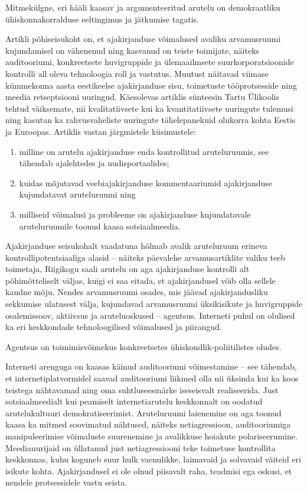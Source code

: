 \documentclass[estonian,]{article}
\begin{document}
\begin{blockquote-left}
Mitmekülgne, eri hääli kaasav ja argumenteeritud arutelu on
demokraatliku ühiskonnakorralduse eeltingimus ja jätkumise tagatis.
\end{blockquote-left}

Artikli põhiseisukoht on, et ajakirjanduse võimalused avaliku arvamusruumi kujundamisel on vähenenud ning kasvanud on teiste toimijate, näiteks auditooriumi, konkreetsete huvigruppide ja ülemaailmsete suurkorporatsioonide kontrolli all oleva tehnoloogia roll ja vastutus. Muutust näitavad viimase kümmekonna aasta eestikeelse ajakirjanduse sisu, toimetuste tööprotsesside ning meedia retseptsiooni uuringud. Käesolevas artiklis sünteesin Tartu Ülikoolis tehtud väiksemate, nii kvalitatiivsete kui ka kvantitatiivsete uuringute tulemusi ning kasutan ka rahvusvaheliste uuringute tähelepanekuid olukorra kohta Eestis ja Euroopas. Artiklis vastan järgmistele küsimustele:

\begin{enumerate}
\def\labelenumi{\arabic{enumi})}
\item
  milline on arutelu ajakirjanduse enda kontrollitud aruteluruumis, see tähendab ajalehtedes ja uudisportaalides;
\item
  kuidas mõjutavad veebiajakirjanduse kommentaariumid ajakirjanduse kujundatavat aruteluruumi ning
\item
  milliseid võimalusi ja probleeme on ajakirjanduse kujundatavale aruteluruumile toonud kaasa sotsiaalmeedia.
\end{enumerate}

Ajakirjanduse seisukohalt vaadatuna hõlmab avalik aruteluruum erineva kontrollipotentsiaaliga alasid -- näiteks päevalehe arvamusartiklite valiku teeb toimetaja, Riigikogu saali arutelu on aga ajakirjanduse kontrolli alt põhimõtteliselt väljas, kuigi ei saa eitada, et ajakirjandusel võib olla sellele kaudne mõju. Nendes arvamusruumi osades, mis jäävad ajakirjandusliku sekkumise ulatusest välja, kujundavad arvamusruumi üksikisikute ja huvigruppide osalemissoov, aktiivsus ja aruteluoskused -- agentsus. Interneti puhul on olulised ka eri keskkondade tehnoloogilised võimalused ja piirangud.

\begin{blockquote-left}
Agentsus on toimimisvõimekus konkreetsetes ühiskondlik-poliitilistes
oludes.
\end{blockquote-left}

Interneti arenguga on kaasas käinud auditooriumi võimestamine -- see tähendab, et internetiplatvormidel saavad auditooriumi liikmed olla nii üksinda kui ka koos teistega nähtavamad ning oma suhtluseesmärke iseseisvalt realiseerida. Just sotsiaalmeedialt kui peamiselt internetiarutelu keskkonnalt on oodatud arutelukultuuri demokratiseerimist. Aruteluruumi laienemine on aga toonud kaasa ka mitmed soovimatud nähtused, näiteks netiagressioon, auditooriumiga manipuleerimise võimaluste suurenemine ja avalikkuse hoiakute polariseerumine. Meediauurijaid on üllatanud just netiagressiooni teke toimetuse kontrollita keskkonnas, kuhu koguneb suur hulk vaenulikke, laimavaid ja solvavaid väiteid eri isikute kohta. Ajakirjandusel ei ole olnud piisavalt raha, teadmisi ega oskusi, et nendele protsessidele vastu seista.
\end{document}
